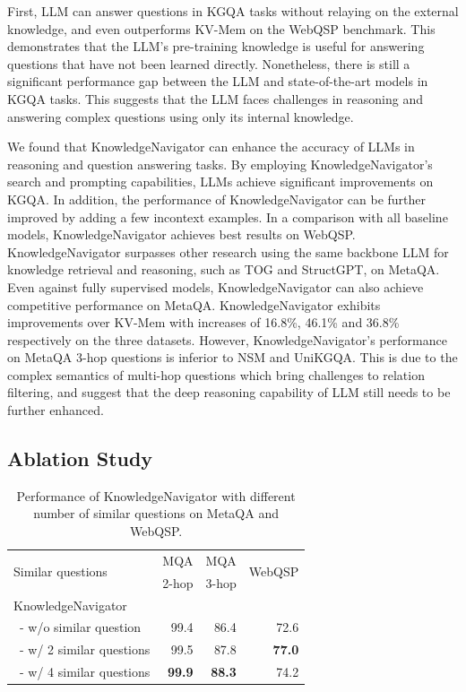 \documentclass{article}
\begin{document}
First, LLM can answer questions in KGQA tasks without relaying on the external knowledge, and even outperforms KV-Mem on the WebQSP benchmark. This demonstrates that the LLM's pre-training knowledge is useful for answering questions that have not been learned directly. Nonetheless, there is still a significant performance gap between the LLM and state-of-the-art models in KGQA tasks. This suggests that the LLM faces challenges in reasoning and answering complex questions using only its internal knowledge.




We found that KnowledgeNavigator can enhance the accuracy of LLMs in reasoning and question answering tasks. By employing KnowledgeNavigator's search and prompting capabilities, LLMs achieve significant improvements on KGQA. In addition, the performance of KnowledgeNavigator can be further improved by adding a few incontext examples. In a comparison with all baseline models, KnowledgeNavigator achieves best results on WebQSP. KnowledgeNavigator surpasses other research using the same backbone LLM for knowledge retrieval and reasoning, such as TOG and StructGPT, on MetaQA. Even against fully supervised models, KnowledgeNavigator can also achieve competitive performance on MetaQA. KnowledgeNavigator exhibits improvements over KV-Mem with increases of 16.8\%, 46.1\% and 36.8\% respectively on the three datasets. However, KnowledgeNavigator's performance on MetaQA 3-hop questions is inferior to NSM and UniKGQA. This is due to the complex semantics of multi-hop questions which bring challenges to relation filtering, and suggest that the deep reasoning capability of LLM still needs to be further enhanced.

\subsection{Ablation Study}


\begin{table}
    \centering
    \begin{tabular}{lrrr}
        \toprule
        \multirow{2}{*}{Similar questions} & \multicolumn{1}{c}{MQA} & \multicolumn{1}{c}{MQA} & \multirow{2}{*}{WebQSP} \\
        & \multicolumn{1}{c}{2-hop} & \multicolumn{1}{c}{3-hop} & \\
        \midrule 
        KnowledgeNavigator \\
        ~- w/o similar question    & 99.4    & 86.4 & 72.6 \\
        ~- w/ 2 similar questions  & 99.5    & 87.8 & \textbf{77.0} \\
        ~- w/ 4 similar questions  & \textbf{99.9}  &  \textbf{88.3}    &  74.2    \\
        \bottomrule
    \end{tabular}
    \caption{Performance of KnowledgeNavigator with different number of similar questions on MetaQA and WebQSP.}
    \label{tab:Ablation study similar}
\end{table}
\end{document}
